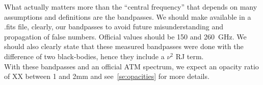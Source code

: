 What actually matters more than the ``central frequency'' that depends on many
assumptions and definitions are the bandpasses. We should make available in a
.fits file, clearly, our bandpasses to avoid future misunderstanding and propagation of
false numbers. Official values should be 150 and 260~GHz. We should also clearly
state that these measured bandpasses were done with the difference of two
black-bodies, hence they include a $\nu^2$ RJ term.\\

With these bandpasses and an official ATM spectrum, we expect an opacity ratio of
XX between 1 and 2mm and see~\ref{se:opacities} for more details.



